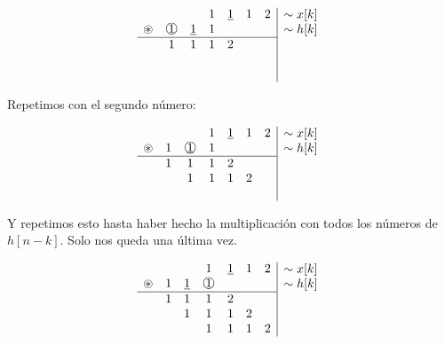 \documentclass[a4paper]{book}
\begin{document}
\begin{enumerate}
\[ \begin{array}{ccccccc}
&                   &               & 1 & \underline{1} & 1 & 2 \\
\circledast & \circledNumber{1} & \underline{1} & 1 &               &   &   \\
\hline
& 1                 & 1             & 1 & 2             &   &   \\
&                   &               &   &               &   &   \\
&                   &               &   &               &   &
\end{array}
\begin{array}{|l}
\sim x[k]   \\
\sim h[k]   \\
\phantom{a} \\
\phantom{a} \\
\phantom{a}
\end{array}\]

Repetimos con el segundo número:

\[ \begin{array}{ccccccc}
&   &                               & 1 & \underline{1} & 1 & 2 \\
\circledast & 1 & \circledNumber{\underline{1}} & 1 &               &   &   \\
\hline
& 1 & 1                             & 1 & 2             &   &   \\
&   & 1                             & 1 & 1             & 2 &   \\
&   &                               &   &               &   &
\end{array}
\begin{array}{|l}
\sim x[k]   \\
\sim h[k]   \\
\phantom{a} \\
\phantom{a} \\
\phantom{a}
\end{array}\]

Y repetimos esto hasta haber hecho la multiplicación con todos los números de $h[n-k]$. Solo nos queda una última vez.

\[ \begin{array}{ccccccc}
&   &               & 1                 & \underline{1} & 1 & 2 \\
\circledast & 1 & \underline{1} & \circledNumber{1} &               &   &   \\
\hline
& 1 & 1             & 1                 & 2             &   &   \\
&   & 1             & 1                 & 1             & 2 &   \\
&   &               & 1                 & 1             & 1 & 2 \\
\end{array}
\begin{array}{|l}
\sim x[k]   \\
\sim h[k]   \\
\phantom{a} \\
\phantom{a} \\
\phantom{a}
\end{array}\]


\end{enumerate}
\end{document}
